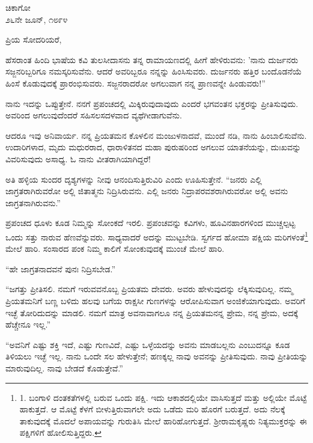 \vspace{-0.3cm}

\begin{flushright}
ಚಿಕಾಗೋ\\೨೬ನೇ ಜೂನ್, ೧೮೯೪
\end{flushright}

\vspace{-0.3cm}

\noindent
ಪ್ರಿಯ ಸೋದರಿಯರೆ,

ಹೆಸರಾಂತ ಹಿಂದಿ ಭಾಷೆಯ ಕವಿ ತುಲಸೀದಾಸನು ತನ್ನ ರಾಮಾಯಣದಲ್ಲಿ ಹೀಗೆ ಹೇಳಿರುವನು: 'ನಾನು ದುರ್ಜನರು ಸಜ್ಜನರಿಬ್ಬರಿಗೂ ನಮಸ್ಕರಿಸುವೆನು. ಆದರೆ ಅವ\break ರಿಬ್ಬರೂ ನನ್ನನ್ನು ಹಿಂಸಿಸುವರು. ದುರ್ಜನರು ಹತ್ತಿರ ಬಂದೊಡನೆಯೆ ಹಿಂಸೆ ಕೊಡುವುದಕ್ಕೆ ಪ್ರಾರಂಭಿಸುವರು. ಸಜ್ಜನರಾದರೋ ಅಗಲುವಾಗ ನನ್ನ ಪ್ರಾಣವನ್ನೇ ಹಿಂಡುವರು!”

ನಾನು ಇದನ್ನು ಒಪ್ಪುತ್ತೇನೆ. ನನಗೆ ಪ್ರಪಂಚದಲ್ಲಿ ಮಿಕ್ಕಿರುವುದಾವುದು ಎಂದರೆ ಭಗವಂತನ ಭಕ್ತರನ್ನು ಪ್ರೀತಿಸುವುದು. ಅವರಿಂದ ಅಗಲುವುದೆಂದರೆ ಸಹಿಸಲಸದಳವಾದ ವ್ಯಥೆಗೀಡಾಗುವೆನು.

ಆದರೂ ಇವು ಅನಿವಾರ್ಯ. ನನ್ನ ಪ್ರಿಯತಮನ ಕೊಳಲಿನ ಮಂಜುಳನಾದವೆ, ಮುಂದೆ ನಡಿ, ನಾನು ಹಿಂಬಾಲಿಸುವೆನು. ಉದಾರಿಗಳಾದ, ಮೃದು ಮಧುರರಾದ, ಧಾರಾಳಿತನದ ಮಹಾ ಪುರುಷರಿಂದ ಅಗಲುವ ಯಾತನೆಯನ್ನು, ದುಃಖವನ್ನು ವಿವರಿಸುವುದು ಅಸಾಧ್ಯ. ಓ ನಾನು ವೀತರಾಗಿಯಾಗಿದ್ದರೆ!

ಅತಿ ಹಳ್ಳಿಯ ಸುಂದರ ದೃಶ್ಯಗಳನ್ನು ನೀವು ಆನಂದಿಸುತ್ತಿರುವಿರಿ ಎಂದು ಊಹಿಸುತ್ತೇನೆ. ``ಜನರು ಎಲ್ಲಿ ಜಾಗ್ರತರಾಗಿರುವರೋ ಅಲ್ಲಿ ಜಿತಾತ್ಮನು ನಿದ್ರಿಸಿರುವನು. ಎಲ್ಲಿ ಜನರು ನಿದ್ರಾಪರವಶರಾಗಿರುವರೋ ಅಲ್ಲಿ ಅವನು ಜಾಗ್ರತನಾಗಿರುವನು.”

ಪ್ರಪಂಚದ ಧೂಳು ಕೂಡ ನಿಮ್ಮನ್ನು ಸೋಂಕದೆ ಇರಲಿ. ಪ್ರಪಂಚವನ್ನು ಕವಿಗಳು, ಹೂವಿನಹಾರಗಳಿಂದ ಮುಚ್ಚಲ್ಪಟ್ಟ ಒಂದು ಸತ್ತು ನಾರುವ ಹೆಣವೆನ್ನುವರು. ಸಾಧ್ಯ\break ವಾದರೆ ಅದನ್ನು ಮುಟ್ಟಬೇಡಿ. ಸ್ವರ್ಗದ ಹೋಮಾ ಪಕ್ಷಿಯ ಮರಿಗಳಂತೆ\footnote{1. ಬಂಗಾಳಿ ದಂತಕತೆಗಳಲ್ಲಿ ಬರುವ ಒಂದು ಪಕ್ಷಿ. ಇದು ಆಕಾಶದಲ್ಲಿಯೇ ವಾಸಿಸುತ್ತದೆ ಮತ್ತು ಅಲ್ಲಿಯೇ ಮೊಟ್ಟೆ ಹಾಕುತ್ತದೆ. ಆ ಮೊಟ್ಟೆ ಕೆಳಗೆ ಬೀಳುತ್ತಿರುವಾಗಲೇ ಅದು ಒಡೆದು ಮರಿ ಹೊರಗೆ ಬರುತ್ತದೆ. ಅದು ನೆಲಕ್ಕೆ ತಾಕುವುದಕ್ಕೆ ಮೊದಲೆ ಅಪಾಯವನ್ನು ಗುರುತಿಸಿ ಮೇಲೆ ಹಾರಿಹೋಗುತ್ತದೆ. ಶ‍್ರೀರಾಮಕೃಷ್ಣರು ನಿತ್ಯಮುಕ್ತರನ್ನು ಈ ಪಕ್ಷಿಗಳಿಗೆ ಹೋಲಿಸುತ್ತಿದ್ದರು.} ಮೇಲೆ ಹಾರಿ. ಸಂಸಾರದ ಪಂಕ ನಿಮ್ಮ ಕಾಲಿಗೆ ಸೋಂಕುವುದಕ್ಕೆ ಮುಂಚೆ ಮೇಲೆ ಹಾರಿ.

“ಹೇ ಜಾಗ್ರತನಾದವನೆ ಪುನಃ ನಿದ್ರಿಸಬೇಡ.''

``ಜಗತ್ತು ಪ್ರೀತಿಸಲಿ. ನಮಗೆ ಇರುವವನೊಬ್ಬ ಪ್ರಿಯತಮ ದೇವರು. ಅವರು ಹೇಳುವುದನ್ನು ಲೆಕ್ಕಿಸುವುದಿಲ್ಲ. ನಮ್ಮ ಪ್ರಿಯತಮನಿಗೆ ಬಣ್ಣ ಬಳಿದು ಹಲವು ಬಗೆಯ ರಾಕ್ಷಸೀ ಗುಣಗಳನ್ನು ಆರೋಪಿಸುವಾಗ ಅಂಜಿಕೆಯಾಗುವುದು. ಅವರಿಗೆ ಇಚ್ಛೆ ತೋರಿದುದನ್ನು ಮಾಡಲಿ. ನಮಗೆ ಮಾತ್ರ ಅವನಾವಾಗಲೂ ನನ್ನ ಪ್ರಿಯತಮ\enginline{-}ನನ್ನ ಪ್ರೇಮ, ನನ್ನ ಪ್ರೇಮ, ಅದಕ್ಕೆ ಹೆಚ್ಚೇನೂ ಇಲ್ಲ.”

“ಅವನಿಗೆ ಎಷ್ಟು ಶಕ್ತಿ ಇದೆ, ಎಷ್ಟು ಗುಣವಿದೆ, ಎಷ್ಟು ಒಳ್ಳೆಯದನ್ನು ಅವನು ಮಾಡಬಲ್ಲನು ಎಂಬುದನ್ನೂ ಕೂಡ ತಿಳಿಯಲು ಇಚ್ಛೆ ಇಲ್ಲ. ನಾನು ಒಂದೇ ಸಲ ಹೇಳುತ್ತೇನೆ; ಹಣಕ್ಕಲ್ಲ ನಾವು ಅವನನ್ನು ಪ್ರೀತಿಸುವುದು. ನಾವು ಪ್ರೀತಿಯನ್ನು ಮಾರುವುದಿಲ್ಲ. ನಾವು ಬೇಡದೆ ಕೊಡುತ್ತೇವೆ.”

